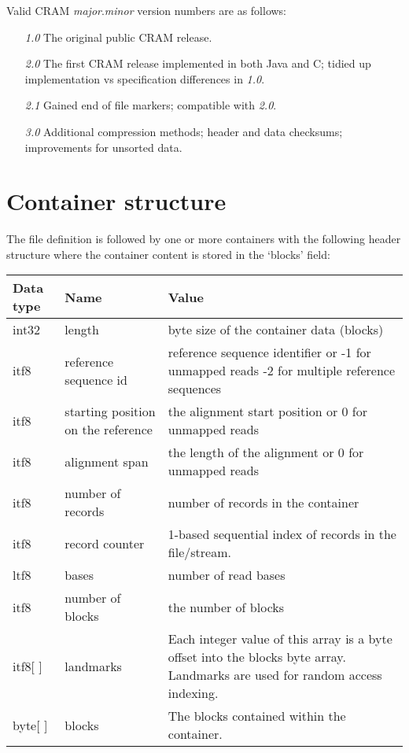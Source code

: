 \documentclass[a4paper]{article}
\begin{document}
Valid CRAM \textit{major}.\textit{minor} version numbers are as follows:

\begin{itemize}
\item[\textit{1.0}]
The original public CRAM release.

\item[\textit{2.0}]
The first CRAM release implemented in both Java and C; tidied up
implementation vs specification differences in \textit{1.0}.

\item[\textit{2.1}]
Gained end of file markers; compatible with \textit{2.0}.

\item[\textit{3.0}]
Additional compression methods; header and data checksums;
improvements for unsorted data.
\end {itemize}

\section{\textbf{Container structure}}

The file definition is followed by one or more containers with the following header 
structure where the container content is stored in the `blocks' field:

\begin{tabular}{|l|>{\raggedright}p{120pt}|>{\raggedright}p{260pt}|}
\hline
\textbf{Data type} & \textbf{Name} & \textbf{Value}
\tabularnewline
\hline
int32 & length & byte size of the container data (blocks)\tabularnewline
\hline
itf8 & reference sequence id & reference sequence identifier  or\linebreak{}
-1 for unmapped reads\linebreak{}
-2 for multiple reference sequences\tabularnewline
\hline
itf8 & starting position on the reference & the alignment start position or\linebreak{}
0 for unmapped reads\tabularnewline
\hline
itf8 & alignment span & the length of the alignment or\linebreak{}
0 for unmapped reads\tabularnewline
\hline
itf8 & number of records & number of records in the container\tabularnewline
\hline
itf8 & record counter & 1-based sequential index of records in the file/stream.\tabularnewline
\hline
ltf8 & bases & number of read bases\tabularnewline
\hline
itf8 & number of blocks & the number of blocks\tabularnewline
\hline
itf8[ ] & landmarks & Each integer value of this array is a byte offset into the 
blocks byte array. Landmarks are used for random access indexing.\tabularnewline
\hline
byte[ ] & blocks & The blocks contained within the container.\tabularnewline
\hline
\end{tabular}
\end{document}
